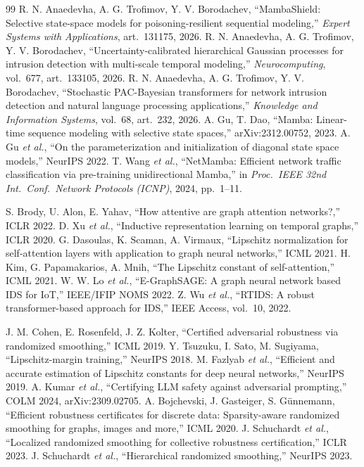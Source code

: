 \documentclass[conference,compsoc]{IEEEtran}
\begin{document}
\begin{thebibliography}{99}
 R. N. Anaedevha, A. G. Trofimov, Y. V. Borodachev, ``MambaShield: Selective state-space models for poisoning-resilient sequential modeling,'' \textit{Expert Systems with Applications}, art.\ 131175, 2026.
 R. N. Anaedevha, A. G. Trofimov, Y. V. Borodachev, ``Uncertainty-calibrated hierarchical Gaussian processes for intrusion detection with multi-scale temporal modeling,'' \textit{Neurocomputing}, vol.\ 677, art.\ 133105, 2026.
 R. N. Anaedevha, A. G. Trofimov, Y. V. Borodachev, ``Stochastic PAC-Bayesian transformers for network intrusion detection and natural language processing applications,'' \textit{Knowledge and Information Systems}, vol.\ 68, art.\ 232, 2026.
 A. Gu, T. Dao, ``Mamba: Linear-time sequence modeling with selective state spaces,'' arXiv:2312.00752, 2023.
 A. Gu \textit{et al.}, ``On the parameterization and initialization of diagonal state space models,'' NeurIPS 2022.
 T. Wang \textit{et al.}, ``NetMamba: Efficient network traffic classification via pre-training unidirectional Mamba,'' in \textit{Proc.\ IEEE 32nd Int.\ Conf.\ Network Protocols (ICNP)}, 2024, pp.\ 1--11.

 S. Brody, U. Alon, E. Yahav, ``How attentive are graph attention networks?,'' ICLR 2022.
 D. Xu \textit{et al.}, ``Inductive representation learning on temporal graphs,'' ICLR 2020.
 G. Dasoulas, K. Scaman, A. Virmaux, ``Lipschitz normalization for self-attention layers with application to graph neural networks,'' ICML 2021.
 H. Kim, G. Papamakarios, A. Mnih, ``The Lipschitz constant of self-attention,'' ICML 2021.
 W. W. Lo \textit{et al.}, ``E-GraphSAGE: A graph neural network based IDS for IoT,'' IEEE/IFIP NOMS 2022.
 Z. Wu \textit{et al.}, ``RTIDS: A robust transformer-based approach for IDS,'' IEEE Access, vol.\ 10, 2022.

 J. M. Cohen, E. Rosenfeld, J. Z. Kolter, ``Certified adversarial robustness via randomized smoothing,'' ICML 2019.
 Y. Tsuzuku, I. Sato, M. Sugiyama, ``Lipschitz-margin training,'' NeurIPS 2018.
 M. Fazlyab \textit{et al.}, ``Efficient and accurate estimation of Lipschitz constants for deep neural networks,'' NeurIPS 2019.
 A. Kumar \textit{et al.}, ``Certifying LLM safety against adversarial prompting,'' COLM 2024, arXiv:2309.02705.
 A. Bojchevski, J. Gasteiger, S. G{\"u}nnemann, ``Efficient robustness certificates for discrete data: Sparsity-aware randomized smoothing for graphs, images and more,'' ICML 2020.
 J. Schuchardt \textit{et al.}, ``Localized randomized smoothing for collective robustness certification,'' ICLR 2023.
 J. Schuchardt \textit{et al.}, ``Hierarchical randomized smoothing,'' NeurIPS 2023.


\end{thebibliography}
\end{document}
